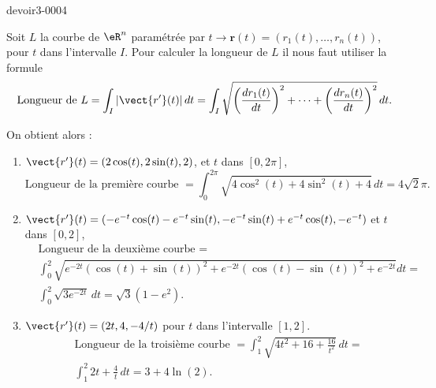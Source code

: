 \begin{corrige}{devoir3-0004}

Soit $L$ la courbe de $\eR^n$ paramétrée par $t\to \textbf{r}(t)= (r_1(t), \ldots, r_n(t))$, pour $t$ dans l'intervalle $I$. 
Pour calculer la longueur de $L$  il  nous faut utiliser la formule 
\begin{equation}
    \textrm{Longueur de } L = \int_{I} |\vect{r'}(t)|\, dt= \int_{I} \sqrt{\left(\frac{d r_1(t)}{dt}\right)^2+\cdots +\left(\frac{d r_n(t)}{dt}\right)^2}\, dt.
\end{equation}

On obtient alors :  
\begin{enumerate}
    \item $\vect{r'}(t)= (2\cos(t), 2\sin(t), 2)$, et $t$ dans $[0,2\pi]$,
  \begin{equation}
   \textrm{Longueur de la première courbe }= \int_0^{2\pi}  \sqrt{4\cos^2(t)+4\sin^2(t) + 4}\, dt= 4\sqrt{2}\pi.  
  \end{equation}
\item $\vect{r'}(t)= (-e^{-t}\cos(t)-e^{-t}\sin(t), -e^{-t}\sin(t)+e^{-t}\cos(t), -e^{-t})$ et  $t$ dans $[0,2]$, 
  \begin{equation}
    \begin{aligned}
      &\textrm{Longueur de la deuxième courbe }=\\
& \int_0^{2}  \sqrt{e^{-2t}(\cos(t)+\sin(t))^2+e^{-2t}(\cos(t)-\sin(t))^2+ e^{-2t}} dt= \\
    &\int_0^{2}  \sqrt{3e^{-2t}}\, dt= \sqrt{3}(1-e^{2}).
    \end{aligned}
  \end{equation}
\item $\vect{r'}(t)= (2t, 4, -4/t)$ pour $t$ dans l'intervalle $[1,2]$.  
 \begin{equation}
    \begin{aligned}
     & \textrm{Longueur de la troisième courbe }= \int_1^{2}  \sqrt{4t^2+16+ \frac{16}{t^2}}\, dt= \\
    &\int_1^{2}  2t+\frac{4}{t}\, dt= 3+4\ln(2).
    \end{aligned}
  \end{equation}
\end{enumerate}
\end{corrige}
